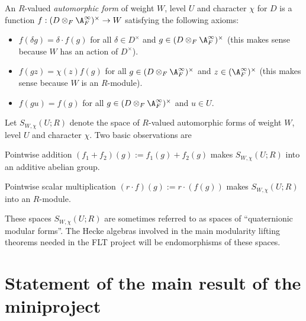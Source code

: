 \begin{definition}
  \label{TotallyDefiniteQuaternionAlgebra.AutomorphicForm}
  \leanok
  An $R$-valued \emph{automorphic form} of weight $W$, level $U$ and character $\chi$ for $D$ is
  a function $f:(D\otimes_F\A_F^\infty)^\times\to W$ satisfying the following axioms:
  \begin{itemize}
    \item $f(\delta g)=\delta\cdot f(g)$ for all $\delta\in D^\times$ and $g\in (D\otimes_F\A_F^\infty)^\times$
    (this makes sense because $W$ has an action of $D^\times$).
    \item $f(gz)=\chi(z)f(g)$ for all $g\in (D\otimes_F\A_F^\infty)^\times$ and $z\in(\A_F^\infty)^\times$
    (this makes sense because $W$ is an $R$-module).
    \item $f(gu)=f(g)$ for all $g\in (D\otimes_F\A_F^\infty)^\times$ and $u\in U$.
  \end{itemize}
\end{definition}

Let $S_{W,\chi}(U;R)$ denote the space of $R$-valued automorphic forms of weight $W$, level $U$ and character
$\chi$. Two basic observations are

\begin{definition}
  \label{TotallyDefiniteQuaternionAlgebra.AutomorphicForm.addCommGroup}
  \leanok
  Pointwise addition $(f_1+f_2)(g):=f_1(g)+f_2(g)$ makes $S_{W,\chi}(U;R)$ into an additive
  abelian group.
\end{definition}

\begin{definition}
  \label{TotallyDefiniteQuaternionAlgebra.AutomorphicForm.module}
  \leanok
  Pointwise scalar multiplication $(r\cdot f)(g):= r\cdot(f(g))$ makes
  $S_{W,\chi}(U;R)$ into an $R$-module.
\end{definition}

These spaces $S_{W,\chi}(U;R)$ are sometimes referred to as spaces of ``quaternionic modular forms''.
The Hecke algebras involved in the main modularity lifting theorems needed in the FLT project
will be endomorphisms of these spaces.

\section{Statement of the main result of the miniproject}

